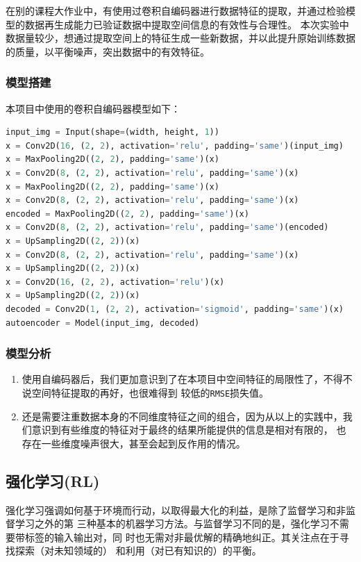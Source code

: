 \documentclass[11pt,a4paper]{elegantpaper}
\begin{document}
\begin{multicols}{2}
在别的课程大作业中，有使用过卷积自编码器进行数据特征的提取，并通过检验模型的数据再生成能力已验证数据中提取空间信息的有效性与合理性。
本次实验中数据量较少，想通过提取空间上的特征生成一些新数据，并以此提升原始训练数据的质量，以平衡噪声，突出数据中的有效特征。


\subsubsection{模型搭建}

本项目中使用的卷积自编码器模型如下：

\begin{lstlisting}[language=Python]
input_img = Input(shape=(width, height, 1))
x = Conv2D(16, (2, 2), activation='relu', padding='same')(input_img)
x = MaxPooling2D((2, 2), padding='same')(x)
x = Conv2D(8, (2, 2), activation='relu', padding='same')(x)
x = MaxPooling2D((2, 2), padding='same')(x)
x = Conv2D(8, (2, 2), activation='relu', padding='same')(x)
encoded = MaxPooling2D((2, 2), padding='same')(x)
x = Conv2D(8, (2, 2), activation='relu', padding='same')(encoded)
x = UpSampling2D((2, 2))(x)
x = Conv2D(8, (2, 2), activation='relu', padding='same')(x)
x = UpSampling2D((2, 2))(x)
x = Conv2D(16, (2, 2), activation='relu')(x)
x = UpSampling2D((2, 2))(x)
decoded = Conv2D(1, (2, 2), activation='sigmoid', padding='same')(x)
autoencoder = Model(input_img, decoded)
\end{lstlisting}

\subsubsection{模型分析}

\begin{enumerate}
  \item 使用自编码器后，我们更加意识到了在本项目中空间特征的局限性了，不得不说空间特征提取的再好，也很难得到
  较低的\lstinline{RMSE}损失值。
  \item 还是需要注重数据本身的不同维度特征之间的组合，因为从以上的实践中，我们意识到有些维度的特征对于最终的结果所能提供的信息是相对有限的，
  也存在一些维度噪声很大，甚至会起到反作用的情况。
\end{enumerate}


\subsection{强化学习(RL)}

强化学习强调如何基于环境而行动，以取得最大化的利益，是除了监督学习和非监督学习之外的第
三种基本的机器学习方法。与监督学习不同的是，强化学习不需要带标签的输入输出对，同
时也无需对非最优解的精确地纠正。其关注点在于寻找探索（对未知领域的）
和利用（对已有知识的）的平衡。


\end{multicols}
\end{document}
